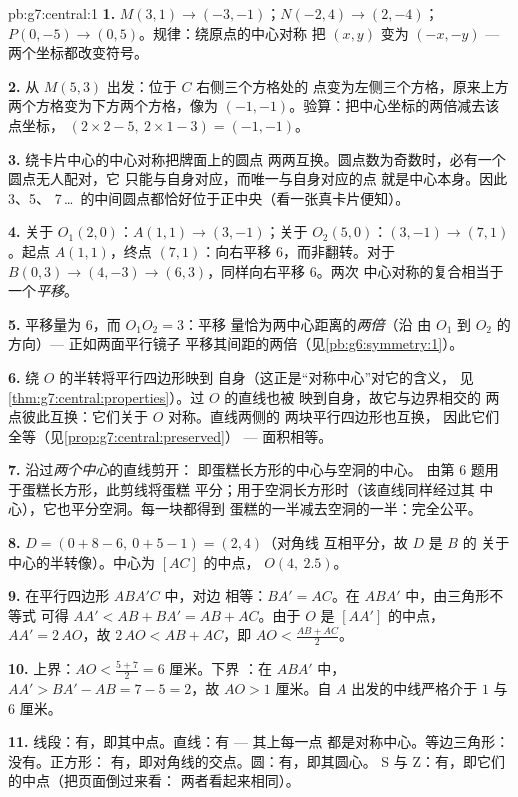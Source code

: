 \begin{solution}{pb:g7:central:1}
\textbf{1.} $M(3, 1) \to (-3, -1)$；$N(-2, 4) \to (2, -4)$；
$P(0, -5) \to (0, 5)$。规律：绕原点的中心对称
把 $(x, y)$ 变为 $(-x, -y)$ --- 两个坐标都改变符号。

\textbf{2.} 从 $M(5, 3)$ 出发：位于 $C$ 右侧三个方格处的
点变为左侧三个方格，原来上方两个方格变为下方两个方格，像为
$(-1, -1)$。验算：把中心坐标的两倍减去该点坐标，
$(2 \times 2 - 5,\ 2 \times 1 - 3) = (-1, -1)$。

\textbf{3.} 绕卡片中心的中心对称把牌面上的圆点
两两互换。圆点数为奇数时，必有一个圆点无人配对，它
只能与自身对应，而唯一与自身对应的点
就是中心本身。因此 3、5、
7\,\dots\ 的中间圆点都恰好位于正中央（看一张真卡片便知）。

\textbf{4.} 关于 $O_1(2,0)$：$A(1,1) \to (3,-1)$；关于
$O_2(5,0)$：$(3,-1) \to (7,1)$。起点 $A(1,1)$，终点
$(7,1)$：向右平移 $6$，而非翻转。对于
$B(0,3) \to (4,-3) \to (6,3)$，同样向右平移 $6$。两次
中心对称的复合相当于一个\emph{平移}。

\textbf{5.} 平移量为 $6$，而 $O_1 O_2 = 3$：平移
量恰为两中心距离的\emph{两倍}（沿
由 $O_1$ 到 $O_2$ 的方向）--- 正如两面平行镜子
平移其间距的两倍（见\cref{pb:g6:symmetry:1}）。

\textbf{6.} 绕 $O$ 的半转将平行四边形映到
自身（这正是“对称中心”对它的含义，
见\cref{thm:g7:central:properties}）。过 $O$ 的直线也被
映到自身，故它与边界相交的
两点彼此互换：它们关于 $O$ 对称。直线两侧的
两块平行四边形也互换，
因此它们全等（见\cref{prop:g7:central:preserved}）
--- 面积相等。

\textbf{7.} 沿过\emph{两个中心}的直线剪开：
即蛋糕长方形的中心与空洞的中心。
由第 6 题用于蛋糕长方形，此剪线将蛋糕
平分；用于空洞长方形时（该直线同样经过其
中心），它也平分空洞。每一块都得到
蛋糕的一半减去空洞的一半：完全公平。

\textbf{8.} $D = (0 + 8 - 6,\ 0 + 5 - 1) = (2, 4)$（对角线
互相平分，故 $D$ 是 $B$ 的
关于中心的半转像）。中心为 $[AC]$ 的中点，
$O(4,\ 2.5)$。

\textbf{9.} 在平行四边形 $ABA'C$ 中，对边
相等：$BA' = AC$。在 $ABA'$ 中，由三角形不等式
可得 $AA' < AB + BA' = AB + AC$。由于 $O$ 是
$[AA']$ 的中点，$AA' = 2\,AO$，故 $2\,AO < AB + AC$，即
$AO < \frac{AB + AC}{2}$。

\textbf{10.} 上界：$AO < \frac{5 + 7}{2} = 6$ 厘米。下界
：在 $ABA'$ 中，$AA' > BA' - AB = 7 - 5 = 2$，故
$AO > 1$ 厘米。自 $A$ 出发的中线严格介于 $1$ 与
$6$ 厘米。

\textbf{11.} 线段：有，即其中点。直线：有 --- 其上每一点
都是对称中心。等边三角形：没有。正方形：
有，即对角线的交点。圆：有，即其圆心。
S 与 Z：有，即它们的中点（把页面倒过来看：
两者看起来相同）。


\end{solution}
